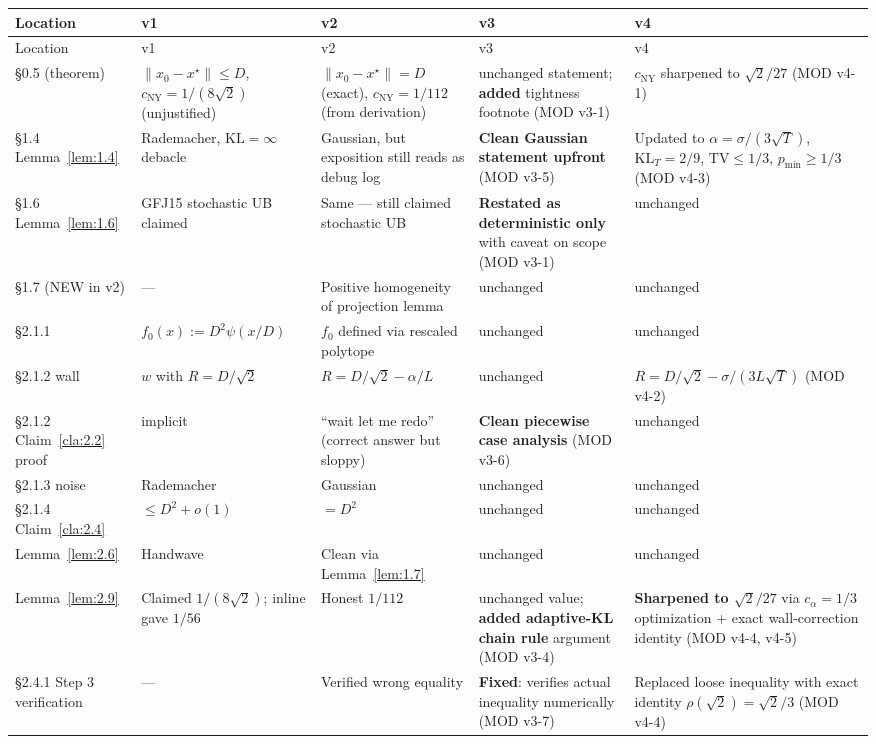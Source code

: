 \documentclass[11pt,a4paper]{article}
\theoremstyle{plain}
\theoremstyle{definition}
\theoremstyle{remark}
\newcommand{\KL}{\mathrm{KL}}
\newcommand{\TV}{\mathrm{TV}}
\begin{document}
\footnotesize
\begin{longtable}{@{}p{2.0cm}p{2.9cm}p{2.9cm}p{2.9cm}p{2.9cm}@{}}
\toprule
Location & v1 & v2 & v3 & v4 \\
\midrule
\endfirsthead
\toprule
Location & v1 & v2 & v3 & v4 \\
\midrule
\endhead
\bottomrule
\endlastfoot
\S0.5 (theorem) & $\|x_0 - x^\star\| \leq D$, $c_\mathrm{NY} = 1/(8\sqrt 2)$ (unjustified) & $\|x_0 - x^\star\| = D$ (exact), $c_\mathrm{NY} = 1/112$ (from derivation) & unchanged statement; \textbf{added} tightness footnote (MOD v3-1) & $c_\mathrm{NY}$ sharpened to $\sqrt 2/27$ (MOD v4-1) \\
\S1.4 Lemma~\ref{lem:1.4} & Rademacher, $\KL=\infty$ debacle & Gaussian, but exposition still reads as debug log & \textbf{Clean Gaussian statement upfront} (MOD v3-5) & Updated to $\alpha = \sigma/(3\sqrt T)$, $\KL_T = 2/9$, $\TV \le 1/3$, $p_{\min} \ge 1/3$ (MOD v4-3) \\
\S1.6 Lemma~\ref{lem:1.6} & GFJ15 stochastic UB claimed & Same --- still claimed stochastic UB & \textbf{Restated as deterministic only} with caveat on scope (MOD v3-1) & unchanged \\
\S1.7 (NEW in v2) & --- & Positive homogeneity of projection lemma & unchanged & unchanged \\
\S2.1.1 & $f_0(x) := D^2\psi(x/D)$ & $f_0$ defined via rescaled polytope & unchanged & unchanged \\
\S2.1.2 wall & $w$ with $R = D/\sqrt 2$ & $R = D/\sqrt 2 - \alpha/L$ & unchanged & $R = D/\sqrt 2 - \sigma/(3L\sqrt T)$ (MOD v4-2) \\
\S2.1.2 Claim~\ref{cla:2.2} proof & implicit & ``wait let me redo'' (correct answer but sloppy) & \textbf{Clean piecewise case analysis} (MOD v3-6) & unchanged \\
\S2.1.3 noise & Rademacher & Gaussian & unchanged & unchanged \\
\S2.1.4 Claim~\ref{cla:2.4} & $\leq D^2 + o(1)$ & $= D^2$ & unchanged & unchanged \\
Lemma~\ref{lem:2.6} & Handwave & Clean via Lemma~\ref{lem:1.7} & unchanged & unchanged \\
Lemma~\ref{lem:2.9} & Claimed $1/(8\sqrt 2)$; inline gave $1/56$ & Honest $1/112$ & unchanged value; \textbf{added adaptive-KL chain rule} argument (MOD v3-4) & \textbf{Sharpened to $\sqrt 2/27$} via $c_\alpha = 1/3$ optimization + exact wall-correction identity (MOD v4-4, v4-5) \\
\S2.4.1 Step 3 verification & --- & Verified wrong equality & \textbf{Fixed}: verifies actual inequality numerically (MOD v3-7) & Replaced loose inequality with exact identity $\rho(\sqrt 2) = \sqrt 2/3$ (MOD v4-4) \\

\end{longtable}
\end{document}
